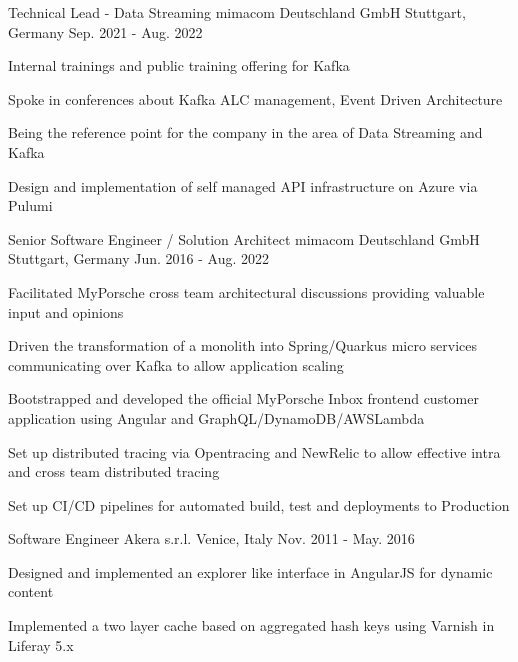 \begin{cventries}
  \cventry
    {Technical Lead - Data Streaming} %
    {mimacom Deutschland GmbH} %
    {Stuttgart, Germany} %
    {Sep. 2021 - Aug. 2022} %
    {
      \begin{cvitems} %
        \item {Internal trainings and public training offering for Kafka}
        \item {Spoke in conferences about Kafka ALC management, Event Driven Architecture}
        \item {Being the reference point for the company in the area of Data Streaming and Kafka}
        \item {Design and implementation of self managed API infrastructure on Azure via Pulumi}
      \end{cvitems}
    }

  \cventry
    {Senior Software Engineer / Solution Architect} %
    {mimacom Deutschland GmbH} %
    {Stuttgart, Germany} %
    {Jun. 2016 - Aug. 2022} %
    {
      \begin{cvitems} %
        \item {Facilitated MyPorsche cross team architectural discussions providing valuable input and opinions}
        \item {Driven the transformation of a monolith into Spring/Quarkus micro services communicating over Kafka to allow application scaling}
        \item {Bootstrapped and developed the official MyPorsche Inbox frontend customer application using Angular and GraphQL/DynamoDB/AWSLambda}
        \item {Set up distributed tracing via Opentracing and NewRelic to allow effective intra and cross team distributed tracing}
        \item {Set up CI/CD pipelines for automated build, test and deployments to Production}
      \end{cvitems}
    }

  \cventry
    {Software Engineer} %
    {Akera s.r.l.} %
    {Venice, Italy} %
    {Nov. 2011 - May. 2016} %
    {
      \begin{cvitems} %
        \item {Designed and implemented an explorer like interface in AngularJS for dynamic content}
        \item {Implemented a two layer cache based on aggregated hash keys using Varnish in Liferay 5.x}
      \end{cvitems}
    }

\end{cventries}
